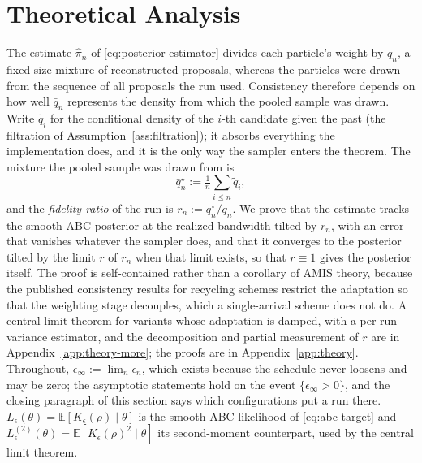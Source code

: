 \documentclass[10pt]{article}
\theoremstyle{plain}
\theoremstyle{definition}
\begin{document}
\section{Theoretical Analysis}\label{sec:theory}
The estimate $\widehat\pi_n$ of \eqref{eq:posterior-estimator} divides each particle's weight by $\bar q_n$, a fixed-size mixture of reconstructed proposals, whereas the particles were drawn from the sequence of all proposals the run used. Consistency therefore depends on how well $\bar q_n$ represents the density from which the pooled sample was drawn. Write $\tilde q_i$ for the conditional density of the $i$-th candidate given the past (the filtration of Assumption~\ref{ass:filtration}); it absorbs everything the implementation does, and it is the only way the sampler enters the theorem. The mixture the pooled sample was drawn from is
\begin{equation}
\bar q^\star_n:=\tfrac1n\textstyle\sum_{i\le n}\tilde q_i,
\label{eq:draw-mixture}
\end{equation}
and the \emph{fidelity ratio} of the run is $r_n:=\bar q^\star_n/\bar q_n$. We prove that the estimate tracks the smooth-ABC posterior at the realized bandwidth tilted by $r_n$, with an error that vanishes whatever the sampler does, and that it converges to the posterior tilted by the limit $r$ of $r_n$ when that limit exists, so that $r\equiv1$ gives the posterior itself. The proof is self-contained rather than a corollary of AMIS theory, because the published consistency results for recycling schemes \citep{marin2019consistency} restrict the adaptation so that the weighting stage decouples, which a single-arrival scheme does not do. A central limit theorem for variants whose adaptation is damped, with a per-run variance estimator, and the decomposition and partial measurement of $r$ are in Appendix~\ref{app:theory-more}; the proofs are in Appendix~\ref{app:theory}. Throughout, $\epsilon_\infty:=\lim_n\epsilon_n$, which exists because the schedule never loosens and may be zero; the asymptotic statements hold on the event $\{\epsilon_\infty>0\}$, and the closing paragraph of this section says which configurations put a run there. $L_\epsilon(\theta)=\mathbb{E}[K_\epsilon(\rho)\mid\theta]$ is the smooth ABC likelihood of \eqref{eq:abc-target} and $L^{(2)}_\epsilon(\theta)=\mathbb{E}[K_\epsilon(\rho)^2\mid\theta]$ its second-moment counterpart, used by the central limit theorem.
\end{document}
